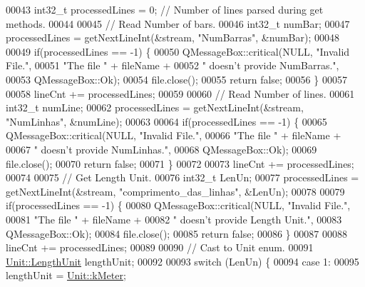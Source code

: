 \begin{DoxyCode}
00043   int32\_t processedLines = 0; \textcolor{comment}{// Number of lines parsed during get methods.}
00044 
00045   \textcolor{comment}{// Read Number of bars.}
00046   int32\_t numBar;
00047   processedLines = getNextLineInt(&stream, \textcolor{stringliteral}{"NumBarras"}, &numBar);
00048 
00049   \textcolor{keywordflow}{if}(processedLines == -1) \{
00050     QMessageBox::critical(NULL, \textcolor{stringliteral}{"Invalid File."},
00051                           \textcolor{stringliteral}{"The file "} + fileName +
00052                           \textcolor{stringliteral}{" doesn't provide NumBarras."},
00053                           QMessageBox::Ok);
00054     file.close();
00055     \textcolor{keywordflow}{return} \textcolor{keyword}{false};
00056   \}
00057 
00058   lineCnt += processedLines;
00059 
00060   \textcolor{comment}{// Read Number of lines.}
00061   int32\_t numLine;
00062   processedLines = getNextLineInt(&stream, \textcolor{stringliteral}{"NumLinhas"}, &numLine);
00063 
00064   \textcolor{keywordflow}{if}(processedLines == -1) \{
00065     QMessageBox::critical(NULL, \textcolor{stringliteral}{"Invalid File."},
00066                           \textcolor{stringliteral}{"The file "} + fileName +
00067                           \textcolor{stringliteral}{" doesn't provide NumLinhas."},
00068                           QMessageBox::Ok);
00069     file.close();
00070     \textcolor{keywordflow}{return} \textcolor{keyword}{false};
00071   \}
00072 
00073   lineCnt += processedLines;
00074 
00075   \textcolor{comment}{// Get Length Unit.}
00076   int32\_t LenUn;
00077   processedLines = getNextLineInt(&stream, \textcolor{stringliteral}{"comprimento\_das\_linhas"}, &LenUn);
00078 
00079   \textcolor{keywordflow}{if}(processedLines == -1) \{
00080     QMessageBox::critical(NULL, \textcolor{stringliteral}{"Invalid File."},
00081                           \textcolor{stringliteral}{"The file "} + fileName +
00082                           \textcolor{stringliteral}{" doesn't provide Length Unit."},
00083                           QMessageBox::Ok);
00084     file.close();
00085     \textcolor{keywordflow}{return} \textcolor{keyword}{false};
00086   \}
00087 
00088   lineCnt += processedLines;
00089 
00090   \textcolor{comment}{// Cast to Unit enum.}
00091   \hyperlink{class_unit_a8c8921f7b225ad6063b1cb573425b9a0}{Unit::LengthUnit} lengthUnit;
00092 
00093   \textcolor{keywordflow}{switch} (LenUn) \{
00094   \textcolor{keywordflow}{case} 1:
00095     lengthUnit = \hyperlink{class_unit_a8c8921f7b225ad6063b1cb573425b9a0abfa41ebe7ee649a1f02c9b8ae570434b}{Unit::kMeter};

\end{DoxyCode}
